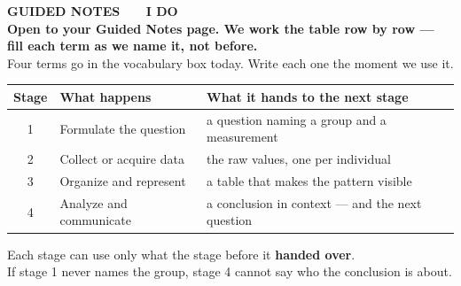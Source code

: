 \documentclass[aspectratio=169, 11pt]{beamer}
\newcommand{\redink}[1]{{\color{redacc}\bfseries #1}}
\begin{document}
{
\begin{frame}[plain]
  \vspace{1.8cm}\hspace{0.8cm}%
  \begin{minipage}{0.86\textwidth}
    {\color{goldacc}\bfseries\small GUIDED NOTES \ \textbullet\ \ I DO}\\[0.7cm]
    {\color{white}\bfseries\Large Open to your Guided Notes page. We work the table row by
    row --- fill each term as we name it, not before.}\\[0.9cm]
    {\color{frostmid}\small Four terms go in the vocabulary box today. Write each one the
    moment we use it.}
  \end{minipage}
\end{frame}
}

\begin{frame}[t, plain]
  \vspace{2pt}
  \begin{center}
    \small
    \renewcommand{\arraystretch}{1.3}
    \begin{tabular}{@{} c l l @{}}
    \hline
    \textbf{Stage} & \textbf{What happens} & \textbf{What it hands to the next stage} \\
    \hline
    1 & Formulate the question  & a question naming a group and a measurement \\
    2 & Collect or acquire data & the raw values, one per individual \\
    3 & Organize and represent  & a table that makes the pattern visible \\
    4 & Analyze and communicate & a conclusion in context --- and the next question \\
    \hline
    \end{tabular}
  \end{center}
  \vspace{8pt}
  \begin{center}
    {\large Each stage can use only what the stage before it \redink{handed over}.}\\[6pt]
    {\small\color{slate} If stage 1 never names the group, stage 4 cannot say who the
    conclusion is about.}
  \end{center}
\end{frame}
\end{document}
